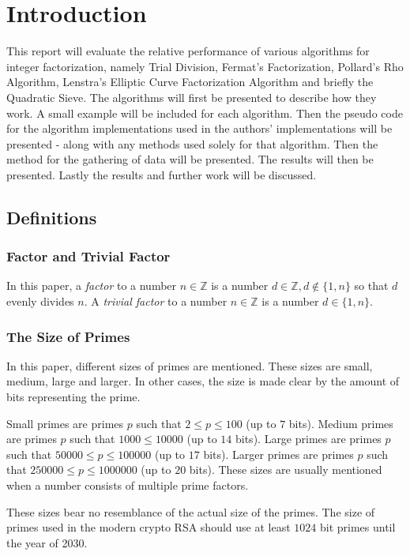 \chapter{Introduction}

\noindent This report will evaluate the relative performance of various algorithms for integer factorization, namely Trial Division, Fermat's Factorization, Pollard's Rho Algorithm, Lenstra's Elliptic Curve Factorization Algorithm and briefly the Quadratic Sieve. The algorithms will first be presented to describe how they work. A small example will be included for each algorithm. Then the pseudo code for the algorithm implementations used in the authors' implementations will be presented - along with any methods used solely for that algorithm. Then the method for the gathering of data will be presented. The results will then be presented. Lastly the results and further work will be discussed.

\section{Definitions}

\subsection{Factor and Trivial Factor}
In this paper, a \textit{factor} to a number $n\in\mathbb{Z}$ is a number $d\in\mathbb{Z}, d\notin\{1, n\}$ so that $d$ evenly divides $n$. A \textit{trivial factor} to a number $n\in\mathbb{Z}$ is a number $d\in\{1, n\}$.

\subsection{The Size of Primes}
In this paper, different sizes of primes are mentioned. These sizes are small, medium, large and larger. In other cases, the size is made clear by the amount of bits representing the prime.

Small primes are primes $p$ such that $2\leq p \leq 100$ (up to $7$ bits). Medium primes are primes $p$ such that $1000 \leq 10000$ (up to $14$ bits). Large primes are primes $p$ such that $50000\leq p \leq 100000$ (up to $17$ bits). Larger primes are primes $p$ such that $250000\leq p \leq 1000000$ (up to $20$ bits). These sizes are usually mentioned when a number consists of multiple prime factors.

These sizes bear no resemblance of the actual size of the primes. The size of primes used in the modern crypto RSA should use at least $1024$ bit primes until the year of 2030\cite{keysize}.

